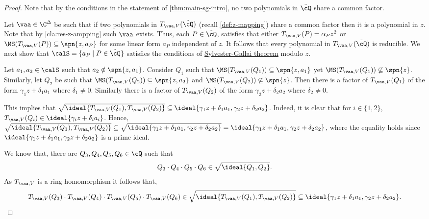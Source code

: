 \begin{proof}
	Note that by the conditions  in the statement of \autoref{thm:main-sg-intro}, no two polynomials in $\tilde{\cQ}$ share a common factor.
	
	Let $\vaa\in\C^\Delta$ be such that if two polynomials in $T_{\vaa, V}(\tilde{\cQ})$ (recall \autoref{def:z-mapping}) share a common factor then it is a polynomial in $z$. Note that by \autoref{cla:res-z-ampping} such $\vaa$ exists. Thus, each $P\in \tilde{\cQ}$, satisfies that either $T_{\vaa, V}(P)=\alpha_P z^2$ or $\MS(T_{\vaa, V}(P))\subseteq \spn{z,a_P}$ for some linear form $a_P$ independent of $z$.
	It follows that every polynomial in $T_{\vaa, V}(\tilde{\cQ})$ is reducible. We next show that $\calS = \{a_P \mid P\in \tilde\cQ\}$ satisfies the conditions of \hyperref[thm:SG-linforms]{Sylvester-Gallai theorem} modulo $z$. 
	
	Let $a_1, a_2 \in \calS$ such that $a_2 \notin \spn{z,a_1}$. Consider $Q_1$ such that $\MS(T_{\vaa, V}(Q_1)) \subseteq \spn{z,a_1}$ yet $\MS(T_{\vaa, V}(Q_1)) \not\subseteq \spn{z}$. Similarly, let $Q_2$ be such that $\MS(T_{\vaa, V}(Q_2)) \subseteq \spn{z,a_2}$ and $\MS(T_{\vaa, V}(Q_2)) \not\subseteq \spn{z}$.
	Then there is a factor of $T_{\vaa,V}(Q_1)$ of the form $\gamma_1 z + \delta_1 a_1$ where $\delta_1\neq 0$. Similarly  there is a factor of $T_{\vaa,V}(Q_2)$ of the form $\gamma_2 z + \delta_2 a_2$ where $\delta_2\neq 0$.
	
	This implies that $\sqrt{\ideal{T_{\vaa,V}(Q_1), T_{\vaa,V}(Q_2)}} \subseteq \ideal{\gamma_1 z + \delta_1 a_1, \gamma_2 z + \delta_2 a_2}$. Indeed, it is clear that for $i\in\{1,2\}$, ${T_{\vaa,V}(Q_i)}\in\ideal{\gamma_i z + \delta_i a_i}$. Hence, $\sqrt{\ideal{T_{\vaa,V}(Q_1), T_{\vaa,V}(Q_2)}} \subseteq \sqrt{\ideal{\gamma_1 z + \delta_1 a_1, \gamma_2 z + \delta_2 a_2}}=\ideal{\gamma_1 z + \delta_1 a_1, \gamma_2 z + \delta_2 a_2}$, where the equality holds since $\ideal{\gamma_1 z + \delta_1 a_1, \gamma_2 z + \delta_2 a_2}$ is a prime ideal.
	
	 We know that, there are $Q_3,Q_4,Q_5,Q_6\in \cQ$ such that 
	\[
	Q_3\cdot Q_4\cdot Q_5\cdot Q_6 \in \sqrt{\ideal{Q_1,Q_2}}.
	\] 
	As $T_{\vaa,V}$ is a ring homomorphism it follows that,
	\[
	T_{\vaa,V}(Q_3)\cdot T_{\vaa,V}(Q_4)\cdot T_{\vaa,V}(Q_5)\cdot T_{\vaa,V}(Q_6)\in \sqrt{\ideal{T_{\vaa,V}(Q_1),T_{\vaa,V}(Q_2)}} \subseteq \ideal{\gamma_1 z + \delta_1 a_1, \gamma_2 z + \delta_2 a_2}.
	\] 
	

\end{proof}

